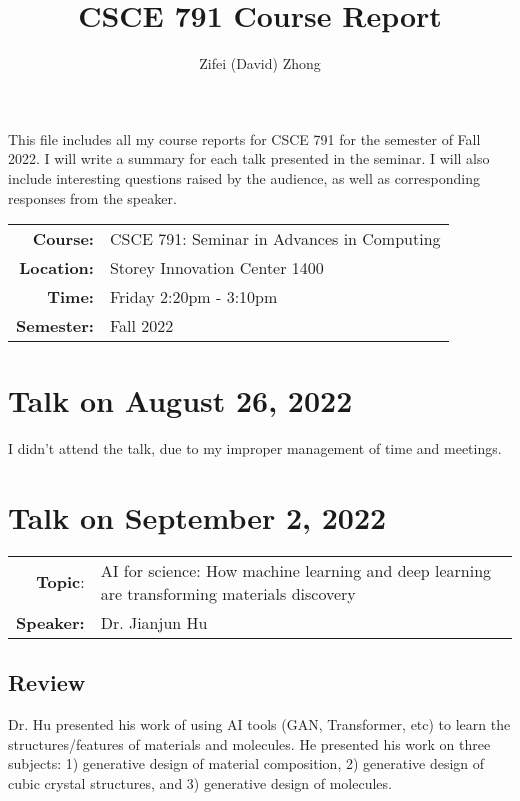 \documentclass[11pt, oneside]{article}   	%
\title{CSCE 791 Course Report}
\author{Zifei (David) Zhong}
\begin{document}
\maketitle

This file includes all my course reports for CSCE 791 for the semester
of Fall 2022. I will write a summary for each talk presented in the
seminar. I will also include interesting questions raised by the
audience, as well as corresponding responses from the speaker.\\

\begin{center}
\begin{tabularx}{0.65\textwidth}{r X}
\textbf{Course:} & CSCE 791: Seminar in Advances in Computing\\
\textbf{Location:} & Storey Innovation Center 1400\\
\textbf{Time:} & Friday 2:20pm - 3:10pm\\
\textbf{Semester:} & Fall 2022
\end{tabularx}
\end{center}

\newpage
\section{Talk on August 26, 2022}
I didn't attend the talk, due to my improper management of time and meetings.

\newpage
\section{Talk on September 2, 2022}
\begin{tabularx} {\textwidth}{r X}
\textbf{Topic}: & AI for science:  How machine learning and deep
learning are transforming materials discovery \\
\textbf{Speaker:} & Dr. Jianjun Hu \\
\end{tabularx}

\subsection{Review}
Dr. Hu presented his work of using AI tools (GAN, Transformer, etc) to
learn the structures/features of materials and molecules.  He
presented his work on three subjects: 1) generative design of material
composition, 2) generative design of cubic crystal structures, and 3)
generative design of molecules.
\end{document}
